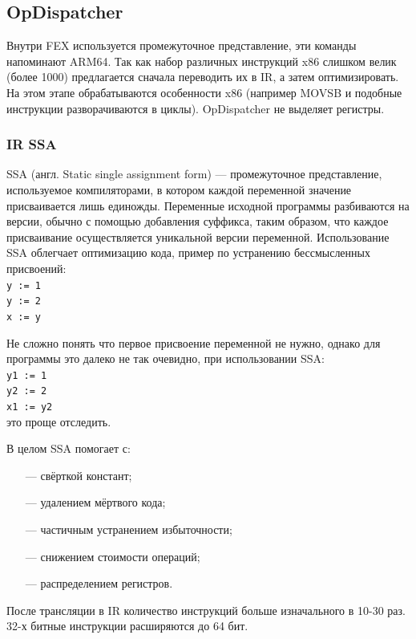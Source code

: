 \subsection{OpDispatcher}

Внутри FEX используется промежуточное представление, эти команды напоминают ARM64. Так как набор различных инструкций x86 слишком велик (более 1000) предлагается сначала переводить их в IR, а затем оптимизировать. На этом этапе обрабатываются особенности x86 (например MOVSB и подобные инструкции разворачиваются в циклы). OpDispatcher не выделяет регистры. 

\subsubsection{IR SSA}
SSA (англ. Static single assignment form) — промежуточное представление, используемое компиляторами, в котором каждой переменной значение присваивается лишь единожды. Переменные исходной программы разбиваются на версии, обычно с помощью добавления суффикса, таким образом, что каждое присваивание осуществляется уникальной версии переменной. 
Использование SSA облегчает оптимизацию кода, пример по устранению бессмысленных присвоений:\\
\texttt{y := 1\\
y := 2\\
x := y}

Не сложно понять что первое присвоение переменной не нужно, однако для программы это далеко не так очевидно, при использовании SSA:\\
\texttt{y1 := 1\\
y2 := 2\\
x1 := y2\\}
это проще отследить. 

В целом SSA помогает с:
\begin{itemize}[leftmargin=1.6\parindent]
	\item[---] свёрткой констант;
	\item[---] удалением мёртвого кода;
	\item[---] частичным устранением избыточности;
	\item[---] снижением стоимости операций;
	\item[---] распределением регистров.
\end{itemize}

После трансляции в IR количество инструкций больше изначального в 10-30 раз. 32-х битные инструкции расширяются до 64 бит.

